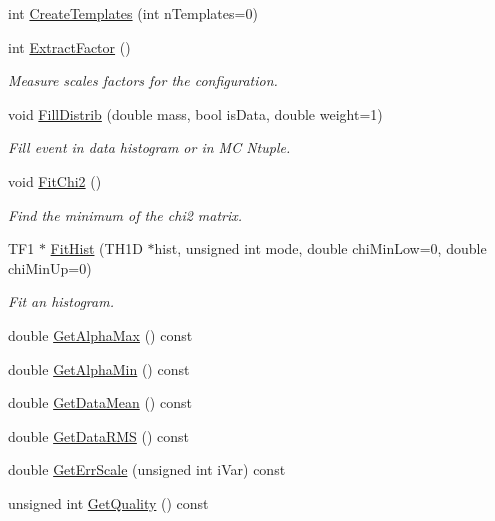 \begin{DoxyCompactItemize}
int \hyperlink{classTemplateMethod_1_1ChiMatrix_a0e00f276f94b4dfd6d95e5629e6e6829}{Create\+Templates} (int n\+Templates=0)
\item 
int \hyperlink{classTemplateMethod_1_1ChiMatrix_aa2d88981439e613df9fa8ec32692e91a}{Extract\+Factor} ()
\begin{DoxyCompactList}\small\item\em Measure scales factors for the configuration. \end{DoxyCompactList}\item 
void \hyperlink{classTemplateMethod_1_1ChiMatrix_a9bf049f7a867a4d5518384831a7de3df}{Fill\+Distrib} (double mass, bool is\+Data, double weight=1)
\begin{DoxyCompactList}\small\item\em Fill event in data histogram or in M\+C Ntuple. \end{DoxyCompactList}\item 
void \hyperlink{classTemplateMethod_1_1ChiMatrix_a30881caef4639d6eecadfa208f6a3c96}{Fit\+Chi2} ()
\begin{DoxyCompactList}\small\item\em Find the minimum of the chi2 matrix. \end{DoxyCompactList}\item 
T\+F1 $\ast$ \hyperlink{classTemplateMethod_1_1ChiMatrix_a89e4e6f0385fec5da2929005c89876fb}{Fit\+Hist} (T\+H1\+D $\ast$hist, unsigned int mode, double chi\+Min\+Low=0, double chi\+Min\+Up=0)
\begin{DoxyCompactList}\small\item\em Fit an histogram. \end{DoxyCompactList}\item 
double \hyperlink{classTemplateMethod_1_1ChiMatrix_a7a1e96c392605a4fe2f8e9ad1b59969c}{Get\+Alpha\+Max} () const 
\item 
double \hyperlink{classTemplateMethod_1_1ChiMatrix_aef987d6cf3240d1cf352e6681653fa1e}{Get\+Alpha\+Min} () const 
\item 
double \hyperlink{classTemplateMethod_1_1ChiMatrix_aa759fbb66a0cfe1edb6ebecc32ad482c}{Get\+Data\+Mean} () const 
\item 
double \hyperlink{classTemplateMethod_1_1ChiMatrix_a664736fc46e923fe433ed8c968783f82}{Get\+Data\+R\+M\+S} () const 
\item 
double \hyperlink{classTemplateMethod_1_1ChiMatrix_a8fb57a7b5a59563a7a94d160037238f4}{Get\+Err\+Scale} (unsigned int i\+Var) const 
\item 
unsigned int \hyperlink{classTemplateMethod_1_1ChiMatrix_a1bbcd07c94d50751016458b1c156438e}{Get\+Quality} () const 

\end{DoxyCompactItemize}
